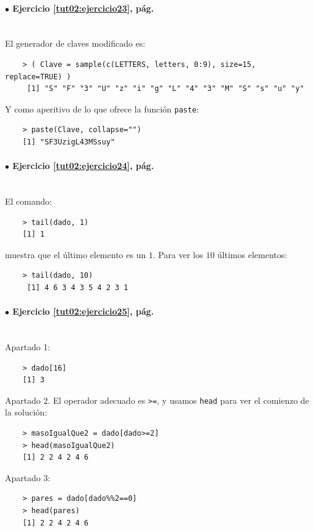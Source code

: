 \documentclass[10pt,a4paper]{article}\usepackage[]{graphicx}\usepackage[]{color}
\begin{document}
\paragraph{\bf $\bullet$ Ejercicio \ref{tut02:ejercicio23},  pág. \pageref{tut02:ejercicio23}}
\label{tut02:ejercicio23:sol}\quad\\
El generador de claves modificado es:
\begin{verbatim}
    > ( Clave = sample(c(LETTERS, letters, 0:9), size=15, replace=TRUE) )
     [1] "S" "F" "3" "U" "z" "i" "g" "L" "4" "3" "M" "S" "s" "u" "y"
\end{verbatim}
Y como aperitivo de lo que ofrece la función {\tt paste}:
\begin{verbatim}
    > paste(Clave, collapse="")
    [1] "SF3UzigL43MSsuy"
\end{verbatim}

\paragraph{\bf $\bullet$ Ejercicio \ref{tut02:ejercicio24},  pág. \pageref{tut02:ejercicio24}}
\label{tut02:ejercicio24:sol}\quad\\
El comando:
\begin{verbatim}
    > tail(dado, 1)
    [1] 1
\end{verbatim}
muestra que el último elemento es un $1$. Para ver los $10$ últimos elementos:
\begin{verbatim}
    > tail(dado, 10)
     [1] 4 6 3 4 3 5 4 2 3 1
\end{verbatim}

\paragraph{\bf $\bullet$ Ejercicio \ref{tut02:ejercicio25},  pág. \pageref{tut02:ejercicio25}}
\label{tut02:ejercicio25:sol}\quad\\
Apartado 1:
\begin{verbatim}
    > dado[16]
    [1] 3
\end{verbatim}
Apartado 2. El operador adecuado es {\tt >=}, y usamos {\tt head} para ver el comienzo de la solución:
\begin{verbatim}
    > masoIgualQue2 = dado[dado>=2]
    > head(masoIgualQue2)
    [1] 2 2 4 2 4 6
\end{verbatim}
Apartado 3:
\begin{verbatim}
    > pares = dado[dado%%2==0]
    > head(pares)
    [1] 2 2 4 2 4 6
\end{verbatim}
\end{document}
